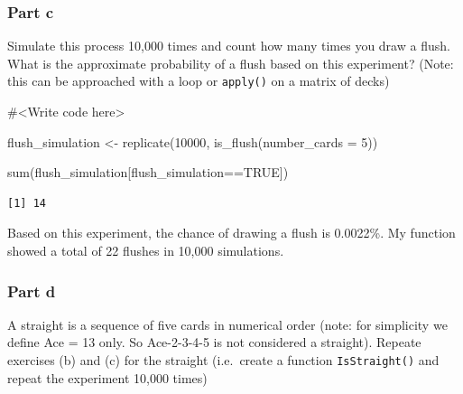 \documentclass[
  letterpaper,
  DIV=11,
  numbers=noendperiod]{scrartcl}
\newenvironment{Shaded}{\begin{snugshade}}{\end{snugshade}}
\newcommand{\AttributeTok}[1]{\textcolor[rgb]{0.40,0.45,0.13}{#1}}
\newcommand{\CommentTok}[1]{\textcolor[rgb]{0.37,0.37,0.37}{#1}}
\newcommand{\ConstantTok}[1]{\textcolor[rgb]{0.56,0.35,0.01}{#1}}
\newcommand{\DecValTok}[1]{\textcolor[rgb]{0.68,0.00,0.00}{#1}}
\newcommand{\FunctionTok}[1]{\textcolor[rgb]{0.28,0.35,0.67}{#1}}
\newcommand{\NormalTok}[1]{\textcolor[rgb]{0.00,0.23,0.31}{#1}}
\newcommand{\OtherTok}[1]{\textcolor[rgb]{0.00,0.23,0.31}{#1}}
\newcommand{\SpecialCharTok}[1]{\textcolor[rgb]{0.37,0.37,0.37}{#1}}
\begin{document}
\hypertarget{part-c-5}{%
\subsubsection{Part c}\label{part-c-5}}

Simulate this process 10,000 times and count how many times you draw a
flush. What is the approximate probability of a flush based on this
experiment? (Note: this can be approached with a loop or
\texttt{apply()} on a matrix of decks)

\begin{Shaded}
\begin{Highlighting}[]
\CommentTok{\#\textless{}Write code here\textgreater{}}

\NormalTok{flush\_simulation }\OtherTok{\textless{}{-}} \FunctionTok{replicate}\NormalTok{(}\DecValTok{10000}\NormalTok{, }\FunctionTok{is\_flush}\NormalTok{(}\AttributeTok{number\_cards =} \DecValTok{5}\NormalTok{))}


\FunctionTok{sum}\NormalTok{(flush\_simulation[flush\_simulation}\SpecialCharTok{==}\ConstantTok{TRUE}\NormalTok{])}
\end{Highlighting}
\end{Shaded}

\begin{verbatim}
[1] 14
\end{verbatim}

Based on this experiment, the chance of drawing a flush is 0.0022\%. My
function showed a total of 22 flushes in 10,000 simulations.

\hypertarget{part-d}{%
\subsubsection{Part d}\label{part-d}}

A straight is a sequence of five cards in numerical order (note: for
simplicity we define Ace = 13 only. So Ace-2-3-4-5 is not considered a
straight). Repeate exercises (b) and (c) for the straight (i.e.~create a
function \texttt{IsStraight()} and repeat the experiment 10,000 times)
\end{document}
